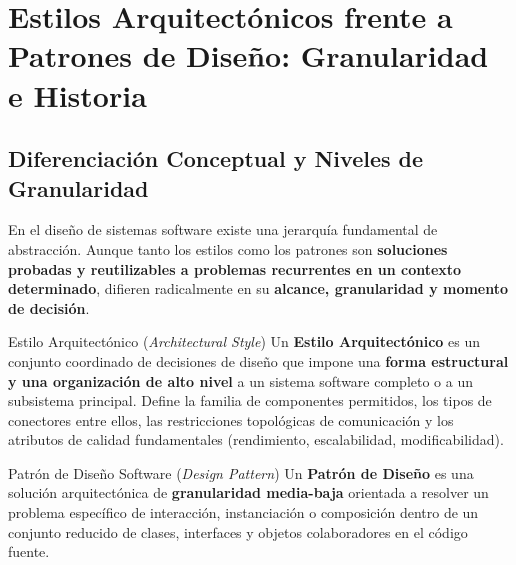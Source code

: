 \vspace{1em}

\section{Estilos Arquitectónicos frente a Patrones de Diseño: Granularidad e Historia}
\label{sec:estilos-vs-patrones}

\subsection{Diferenciación Conceptual y Niveles de Granularidad}

En el diseño de sistemas software existe una jerarquía fundamental de abstracción. Aunque tanto los estilos como los patrones son \textbf{soluciones probadas y reutilizables a problemas recurrentes en un contexto determinado}, difieren radicalmente en su \textbf{alcance, granularidad y momento de decisión}.

\begin{definicion}{Estilo Arquitectónico (\emph{Architectural Style})}
Un \textbf{Estilo Arquitectónico} es un conjunto coordinado de decisiones de diseño que impone una \textbf{forma estructural y una organización de alto nivel} a un sistema software completo o a un subsistema principal. Define la familia de componentes permitidos, los tipos de conectores entre ellos, las restricciones topológicas de comunicación y los atributos de calidad fundamentales (rendimiento, escalabilidad, modificabilidad).
\end{definicion}

\begin{definicion}{Patrón de Diseño Software (\emph{Design Pattern})}
Un \textbf{Patrón de Diseño} es una solución arquitectónica de \textbf{granularidad media-baja} orientada a resolver un problema específico de interacción, instanciación o composición dentro de un conjunto reducido de clases, interfaces y objetos colaboradores en el código fuente.
\end{definicion}

